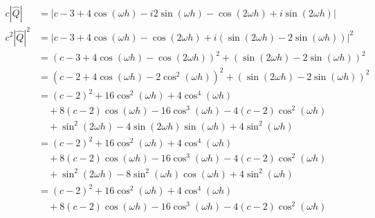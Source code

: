 \documentclass[11pt]{amsart}
\numberwithin{equation}{section}
\begin{document}
\begin{enumerate}[a)]
{          \begin{align}
              c |\hat Q|    & =  \left| c - 3 + 4\cos(\omega h) - i2\sin(\omega h) - \cos(2 \omega h) + i\sin(2\omega h) \right|                                             \\
              c^2|\hat Q|^2 & =  \left| c - 3 + 4\cos(\omega h) - \cos(2 \omega h) + i(\sin(2\omega h) - 2\sin(\omega h)) \right|^2                                          \\
                            & = \left(c - 3 + 4\cos(\omega h) - \cos(2 \omega h)\right)^2 + (\sin(2\omega h) - 2\sin(\omega h))^2                                            \\
                            & = \left(c - 2 + 4\cos(\omega h) - 2\cos^2(\omega h)\right)^2 + (\sin(2\omega h) - 2\sin(\omega h))^2                                           \\
                            & = \left(c - 2\right)^2 + 16 \cos^2(\omega h) + 4 \cos^4 (\omega h)                                                                             \\ \nonumber
                            & \quad + 8 (c-2) \cos(\omega h) - 16 \cos^3(\omega h) - 4 (c- 2) \cos^2 (\omega h)                                                              \\ \nonumber 
                            & \quad + \sin^2(2\omega h) - 4\sin(2\omega h) \sin(\omega h) + 4 \sin^2(\omega h)                                                               \\
                            & = \left(c - 2\right)^2 + 16 \cos^2(\omega h) + 4 \cos^4 (\omega h)                                                                             \\ \nonumber
                            & \quad + 8 (c-2) \cos(\omega h) - 16 \cos^3(\omega h) - 4 (c- 2) \cos^2 (\omega h)                                                              \\ \nonumber 
                            & \quad + \sin^2(2\omega h) - 8\sin^2(\omega h) \cos(\omega h) + 4 \sin^2(\omega h)                                                              \\                                        
                            & = \left( c - 2\right)^2 + 16 \cos^2(\omega h) + 4 \cos^4(\omega h)                                                                             \\ \nonumber
                            & \quad + 8 (c-2) \cos(\omega h) - 16 \cos^3(\omega h) - 4 (c- 2) \cos^2 (\omega h)                                                              \\ \nonumber 

\end{align}}
\end{enumerate}
\end{document}
